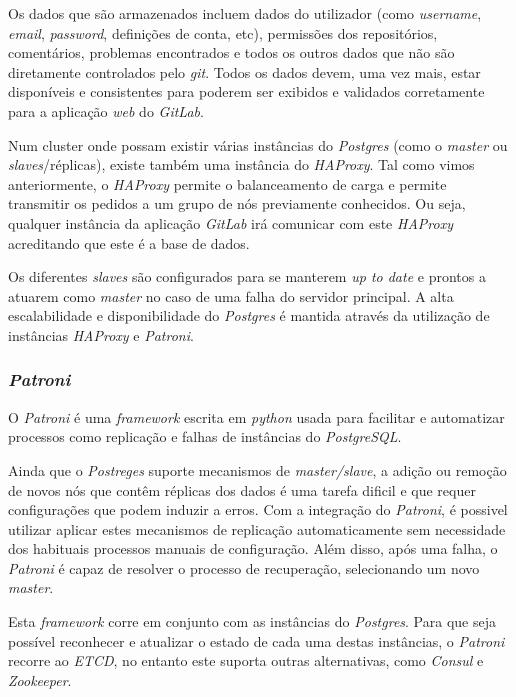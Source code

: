 \documentclass[12pt,a4paper]{article}
\begin{document}
Os dados que são armazenados incluem dados do utilizador (como \emph{username}, \emph{email}, \emph{password}, definições de conta, etc), permissões dos repositórios, comentários, problemas encontrados e todos os outros dados que não são diretamente controlados pelo \emph{git}. Todos os dados devem, uma vez mais, estar disponíveis e consistentes para poderem ser exibidos e validados corretamente para a aplicação \emph{web} do \emph{GitLab}.

Num cluster onde possam existir várias instâncias do \emph{Postgres} (como o \emph{master} ou \emph{slaves}/réplicas), existe também uma instância do \emph{HAProxy}. Tal como vimos anteriormente, o \emph{HAProxy} permite o balanceamento de carga e permite transmitir os pedidos a um grupo de nós previamente conhecidos. Ou seja, qualquer instância da aplicação \emph{GitLab} irá comunicar com este \emph{HAProxy} acreditando que este é a base de dados. 

Os diferentes \emph{slaves} são configurados para se manterem \emph{up to date} e prontos a atuarem como \emph{master} no caso de uma falha do servidor principal. A alta escalabilidade e disponibilidade do \emph{Postgres} é mantida através da utilização de instâncias \emph{HAProxy} e \emph{Patroni}.


\subsubsection{\emph{Patroni}}

O \emph{Patroni} é uma \emph{framework} escrita em \emph{python} usada para facilitar e automatizar processos como replicação e falhas de instâncias do  \emph{PostgreSQL}.

Ainda que o \emph{Postreges} suporte mecanismos de \emph{master/slave}, a adição ou remoção de novos nós que contêm réplicas dos dados é uma tarefa dificil e que requer configurações que podem induzir a erros. Com a integração do \emph{Patroni}, é possivel utilizar aplicar estes mecanismos de replicação automaticamente sem necessidade dos habituais processos manuais de configuração. Além disso, após uma falha, o \emph{Patroni} é capaz de resolver o processo de recuperação, selecionando um novo \emph{master}.

Esta \emph{framework} corre em conjunto com as instâncias do \emph{Postgres}. Para que seja possível reconhecer e atualizar o estado de cada uma destas instâncias, o \emph{Patroni} recorre ao \emph{ETCD}, no entanto este suporta outras alternativas, como \emph{Consul} e \emph{Zookeeper}.
\end{document}
